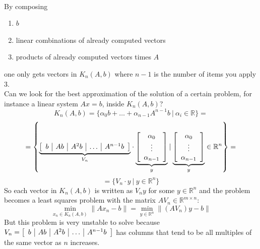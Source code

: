 \documentclass[10pt]{report}
\begin{document}
\paragraph{}
By composing \begin{enumerate}
	\item $b$
	\item linear combinations of already computed vectors
	\item products of already computed vectors times $A$
\end{enumerate}
one only gets vectors in $K_n(A,b)$ where $n-1$ is the number of items you apply 3.\\
Can we look for the best approximation of the solution of a certain problem, for instance a linear system $Ax=b$, inside $K_n(A,b)$?
$$K_n(A,b) = \{\alpha_0b+\ldots + \alpha_{n-1}A^{n-1}b\:|\:\alpha_i\in \mathbb{R}\} =$$ $$= \left\{\underset{V_n}{\underbrace{\left[\begin{array}{c | c | c | c | c}
b & Ab &A^2b & \ldots & A^{n-1}b
\end{array}\right]}}\cdot\underset{y}{\underbrace{\left[\begin{array}{c}
\alpha_0\\\vdots\\\alpha_{n-1}
\end{array}\right]}}\:|\:\underset{y}{\underbrace{\left[\begin{array}{c}
\alpha_0\\\vdots\\\alpha_{n-1}
\end{array}\right]}}\in \mathbb{R}^n \right\}=$$ $$= \{V_n\cdot y\:|\:y \in \mathbb{R}^n\}$$
So each vector in $K_n(A,b)$ is written as $V_ny$ for some $y\in \mathbb{R}^n$ and the problem becomes a least squares problem with the matrix $AV_n\in \mathbb{R}^{m\times n}$:
$$\min_{x_n\in K_n(A,b)} \|Ax_n - b\| = \min_{y\in \mathbb{R}^n} \|(AV_n)y-b\|$$
But this problem is very unstable to solve because $V_n = \left[\begin{array}{c | c | c | c | c}
b & Ab &A^2b & \ldots & A^{n-1}b
\end{array}\right]$ has columns that tend to be all multiples of the same vector as $n$ increases.
\end{document}
